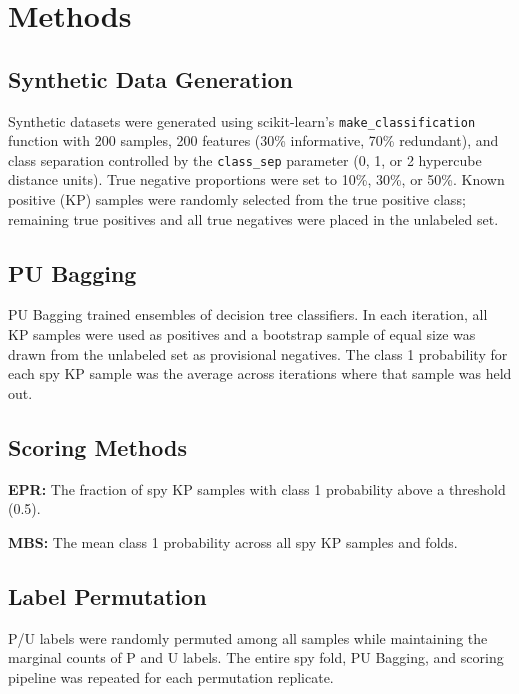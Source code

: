 \documentclass[11pt]{article}
\begin{document}
\section{Methods}

\subsection{Synthetic Data Generation}

Synthetic datasets were generated using scikit-learn's \texttt{make\_classification} function \citep{pedregosa2011} with 200 samples, 200 features (30\% informative, 70\% redundant), and class separation controlled by the \texttt{class\_sep} parameter (0, 1, or 2 hypercube distance units). True negative proportions were set to 10\%, 30\%, or 50\%. Known positive (KP) samples were randomly selected from the true positive class; remaining true positives and all true negatives were placed in the unlabeled set.

\subsection{PU Bagging}

PU Bagging \citep{mordelet2014, breiman1996} trained ensembles of decision tree classifiers. In each iteration, all KP samples were used as positives and a bootstrap sample of equal size was drawn from the unlabeled set as provisional negatives. The class 1 probability for each spy KP sample was the average across iterations where that sample was held out.

\subsection{Scoring Methods}

\textbf{EPR:} The fraction of spy KP samples with class 1 probability above a threshold (0.5).

\textbf{MBS:} The mean class 1 probability across all spy KP samples and folds.

\subsection{Label Permutation}

P/U labels were randomly permuted among all samples while maintaining the marginal counts of P and U labels. The entire spy fold, PU Bagging, and scoring pipeline was repeated for each permutation replicate.
\end{document}
